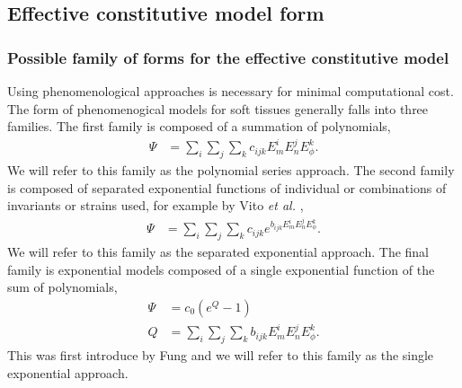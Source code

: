 \subsection{Effective constitutive model form}
\subsubsection{Possible family of forms for the effective constitutive model}

    Using phenomenological approaches is necessary for minimal computational cost. The form of phenomenogical models for soft tissues generally falls into three families. The first family is composed of a summation of polynomials, 
\begin{equation}
\begin{aligned}
\Psi	&= \sum_i\sum_j\sum_k c_{ijk}E_m^i E_n^j E_\phi^k. 
\end{aligned} \label{eqn:polynomialmodelform}
\end{equation}
    We will refer to this family as the polynomial series approach. The second family is composed of separated exponential functions of individual or combinations of invariants or strains used, for example by Vito \textit{et al.} \cite{vito_mechanical_1980},
\begin{align}\label{eqn:vitomodelforms}
\Psi 	&= \sum_i\sum_j\sum_k c_{ijk} e^{b_{ijk}E_m^i E_n^j E_\phi^k}.
\end{align}
    We will refer to this family as the separated exponential approach. The final family is exponential models composed of a single exponential function of the sum of polynomials,
\begin{equation}
\begin{aligned}\label{eqn:exponentialmodelform}
\Psi 	&= c_0 \left(e^{Q} - 1\right) \\
Q		&= \sum_i\sum_j\sum_k b_{ijk}E_m^i E_n^j E_\phi^k.
\end{aligned}
\end{equation}
    This was first introduce by Fung \cite{fung_pseudoelasticity_1979} and we will refer to this family as the single exponential approach. 


